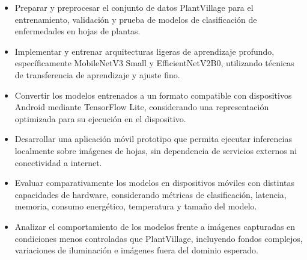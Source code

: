 \begin{itemize}
    \item Preparar y preprocesar el conjunto de datos PlantVillage para el entrenamiento, validación y prueba de modelos de clasificación de 
    enfermedades en hojas de plantas.
    \item Implementar y entrenar arquitecturas ligeras de aprendizaje profundo, específicamente MobileNetV3 Small y EfficientNetV2B0, 
    utilizando técnicas de transferencia de aprendizaje y ajuste fino.
    \item Convertir los modelos entrenados a un formato compatible con dispositivos Android mediante TensorFlow Lite, considerando una 
    representación optimizada para su ejecución en el dispositivo.
    \item Desarrollar una aplicación móvil prototipo que permita ejecutar inferencias localmente sobre imágenes de hojas, sin dependencia de 
    servicios externos ni conectividad a internet.
    \item Evaluar comparativamente los modelos en dispositivos móviles con distintas capacidades de hardware, considerando métricas de 
    clasificación, latencia, memoria, consumo energético, temperatura y tamaño del modelo.
    \item Analizar el comportamiento de los modelos frente a imágenes capturadas en condiciones menos controladas que PlantVillage, 
    incluyendo fondos complejos, variaciones de iluminación e imágenes fuera del dominio esperado.
\end{itemize}
